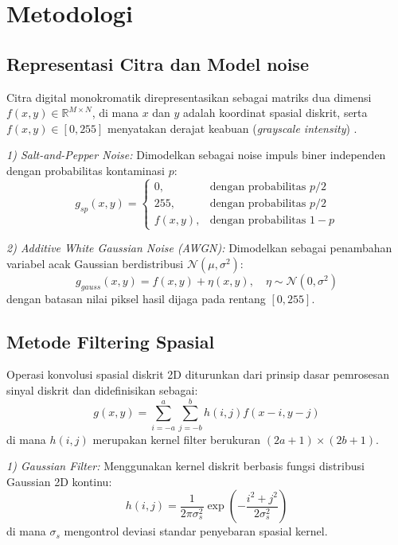 \documentclass[conference,a4paper]{IEEEtran}
\begin{document}
\section{Metodologi}

\subsection{Representasi Citra dan Model noise}
Citra digital monokromatik direpresentasikan sebagai matriks dua dimensi $f(x, y) \in \mathbb{R}^{M \times N}$, di mana $x$ dan $y$ adalah koordinat spasial diskrit, serta $f(x, y) \in [0, 255]$ menyatakan derajat keabuan (\textit{grayscale intensity}) \cite{pratt2007}.

\textit{1) Salt-and-Pepper Noise:} Dimodelkan sebagai noise impuls biner independen dengan probabilitas kontaminasi $p$:
\begin{equation}
	g_{sp}(x, y) = \begin{cases}
		0,       & \text{dengan probabilitas } p/2   \\
		255,     & \text{dengan probabilitas } p/2   \\
		f(x, y), & \text{dengan probabilitas } 1 - p
	\end{cases}
\end{equation}

\textit{2) Additive White Gaussian Noise (AWGN):} Dimodelkan sebagai penambahan variabel acak Gaussian berdistribusi $\mathcal{N}(\mu, \sigma^2)$:
\begin{equation}
	g_{gauss}(x, y) = f(x, y) + \eta(x, y), \quad \eta \sim \mathcal{N}(0, \sigma^2)
\end{equation}
dengan batasan nilai piksel hasil dijaga pada rentang $[0, 255]$.

\subsection{Metode Filtering Spasial}
Operasi konvolusi spasial diskrit 2D diturunkan dari prinsip dasar pemrosesan sinyal diskrit \cite{oppenheim1999} dan didefinisikan sebagai:
\begin{equation}
	g(x, y) = \sum_{i=-a}^{a} \sum_{j=-b}^{b} h(i, j) f(x - i, y - j)
\end{equation}
di mana $h(i, j)$ merupakan kernel filter berukuran $(2a+1) \times (2b+1)$.

\textit{1) Gaussian Filter:} Menggunakan kernel diskrit berbasis fungsi distribusi Gaussian 2D kontinu:
\begin{equation}
	h(i, j) = \frac{1}{2\pi\sigma_s^2} \exp\left( -\frac{i^2 + j^2}{2\sigma_s^2} \right)
\end{equation}
di mana $\sigma_s$ mengontrol deviasi standar penyebaran spasial kernel.
\end{document}
